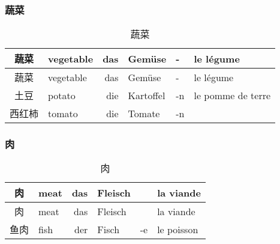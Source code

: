 \documentclass[12pt,A4paper,oneside,reqno]{amsart}
\numberwithin{equation}{section}
\theoremstyle{plain}
\theoremstyle{plain}
\theoremstyle{plain}
\numberwithin{equation}{section}
\theoremstyle{remark}
\begin{document}
\subsubsection{蔬菜}\hspace{1cm}
\begin{longtable}{c|l|rll|l}
	\hline
蔬菜	&	vegetable	&	das	&	Gem\"{u}se	&	-	&	le l\'{e}gume	\\

	
	\hline
	\endhead
	\hline
蔬菜	&	vegetable	&	das	&	Gem\"{u}se	&	-	&	le l\'{e}gume	\\

	
	\hline
	\endfirsthead	
	\hline
	\endfoot
	\hline	
	\caption{蔬菜}
	\endlastfoot				
	土豆	&	potato	&	die	&	Kartoffel	&	-n	&	le pomme de terre	\\
	西红柿	&	tomato	&	die	&	Tomate	&	-n	&		\\
	
	
	
	
\end{longtable}
\subsubsection{肉}\hspace{1cm}
\begin{longtable}{c|l|rll|l}
	\hline
肉	&	meat	&	das	&	Fleisch	&		&	la viande	\\

	\hline
	\endhead
	\hline
肉	&	meat	&	das	&	Fleisch	&		&	la viande	\\

	\hline
	\endfirsthead	
	\hline
	\endfoot
	\hline	
	\caption{肉}
	\endlastfoot				
鱼肉	&	fish	&	der	&	Fisch	&	-e	&	le poisson	\\

	
	
	
\end{longtable}
\end{document}
